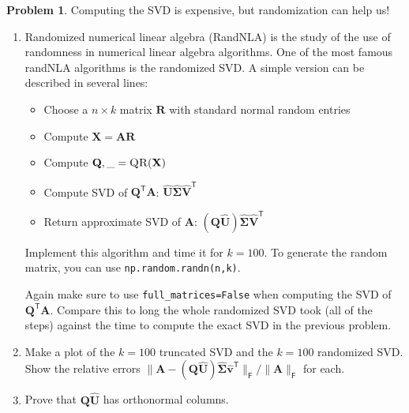 \documentclass[12pt]{article}
\theoremstyle{definition}
\newtheorem{problem}{Problem}
\renewcommand{\vec}{\mathbf}
\newcommand{\T}{\mathsf{T}}
\newcommand{\F}{\mathsf{F}}
\begin{document}
\begin{problem}
    Computing the SVD is expensive, but randomization can help us!
    \begin{enumerate}
        \item Randomized numerical linear algebra (RandNLA) is the study of the use of randomness in numerical linear algebra algorithms. 
            One of the most famous randNLA algorithms is the randomized SVD.
            A simple version can be described in several lines:
            \begin{itemize}
                \item Choose a $n\times k$ matrix $\vec{R}$ with standard normal random entries
                \item Compute $\vec{X} = \vec{A} \vec{R}$
                \item Compute $\vec{Q},\_ = \textsc{QR}(\vec{X})$
                \item Compute SVD of $\vec{Q}^\T \vec{A}$: $\hat{\vec{U}} \hat{\vec{\Sigma}} \hat{\vec{V}}^\T$
                \item Return approximate SVD of $\vec{A}$: $(\vec{Q} \hat{\vec{U}}) \hat{\vec{\Sigma}} \hat{\vec{V}}^\T$  
            \end{itemize}

            Implement this algorithm and time it for $k=100$. 
            To generate the random matrix, you can use \lstinline{np.random.randn(n,k)}.


            Again make sure to use \lstinline{full_matrices=False} when computing the SVD of $\vec{Q}^\T \vec{A}$.
            Compare this to long the whole randomized SVD took (all of the steps) against the time to compute the exact SVD in the previous problem.
        
        \item 
            Make a plot of the $k=100$ truncated SVD and the $k=100$ randomized SVD.
            Show the relative errors $\|\vec{A} - (\vec{Q} \hat{\vec{U}})\hat{\vec{\Sigma}} \hat{\vec{v}}^\T \|_\F/\|\vec{A}\|_\F$ for each. 

        \item Prove that $\vec{Q}\hat{\vec{U}}$ has orthonormal columns.
    \end{enumerate}
\end{problem}
\end{document}
